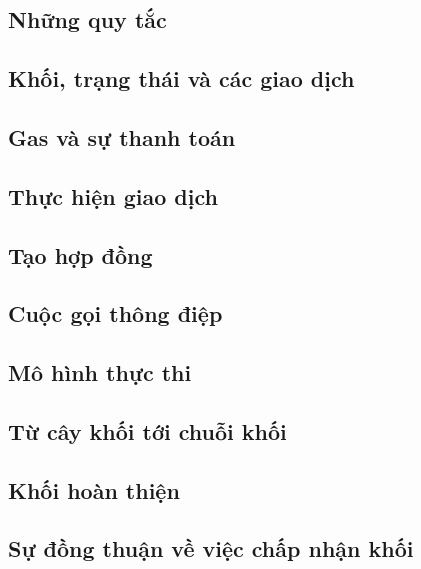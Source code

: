 \documentclass[12pt]{article}
\begin{document}
	\subsection{Những quy tắc}
	

	\subsection{Khối, trạng thái và các giao dịch}
	

	\subsection{Gas và sự thanh toán}
	
	
	\subsection{Thực hiện giao dịch}
	
	
	\subsection{Tạo hợp đồng}
		

	\subsection{Cuộc gọi thông điệp}
			
	
	\subsection{Mô hình thực thi}
			
	
	\subsection{Từ cây khối tới chuỗi khối}
	
	
	\subsection{Khối hoàn thiện}
	
	
	\subsection{Sự đồng thuận về việc chấp nhận khối}
	
\end{document}

